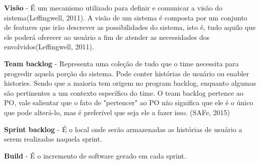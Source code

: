\textbf{Visão} - É um mecanismo utilizado para definir e comunicar a visão do sistema(Leffingwell, 2011). A visão de um sistema é composta por um conjunto de features que irão descrever as possibilidades do sistema, isto é, tudo aquilo que ele poderá oferecer ao usuário a fim de atender as necessidades dos envolvidos(Leffingwell, 2011).

\textbf{Team backlog} - Representa uma coleção de tudo que o time necessita para progredir aquela porção do sistema. Pode conter histórias de usuário ou enabler histories. Sendo que a maioria tem origem no program backlog, enquanto algumas são pertinentes a um contexto específico do time. O team backlog pertence ao PO, vale salientar que o fato de "pertencer" ao PO não significa que ele é o único que pode alterá-lo, mas é preferível que seja ele a fazer isso. (SAFe, 2015)

\textbf{Sprint backlog} - É o local onde serão armazenadas as histórias de usuário a serem realizadas naquela sprint.

\textbf{Build} - É o incremento de software gerado em cada sprint.